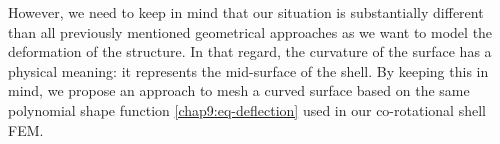 However, we need to keep in mind that our situation is substantially different than all previously mentioned geometrical approaches as we want to model the deformation of the structure. In that regard, the curvature of the surface has a physical meaning: it represents the mid-surface of the shell. By keeping this in mind, we propose an approach to mesh a curved surface based on the same polynomial shape function \eqref{chap9:eq-deflection} used in our co-rotational shell FEM. 

%
%
%
%
